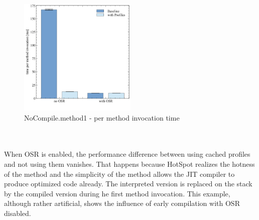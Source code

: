 \begin{figure}[ht]
  \begin{center}
    \centering
    \includegraphics[width=0.5\textwidth]{figures/nocompile.png}
    \caption{NoCompile.method1 - per method invocation time}
    \label{f:nocompile}
  \end{center}
\end{figure}
\\\\
When OSR is enabled, the performance difference between using cached profiles and not using them vanishes.
That happens because HotSpot realizes the hotness of the method and the simplicity of the method allows the JIT compiler to produce optimized code already. The interpreted version is replaced on the stack by the compiled version during he first method invocation. 
This example, although rather artificial, shows the influence of early compilation with OSR disabled.
